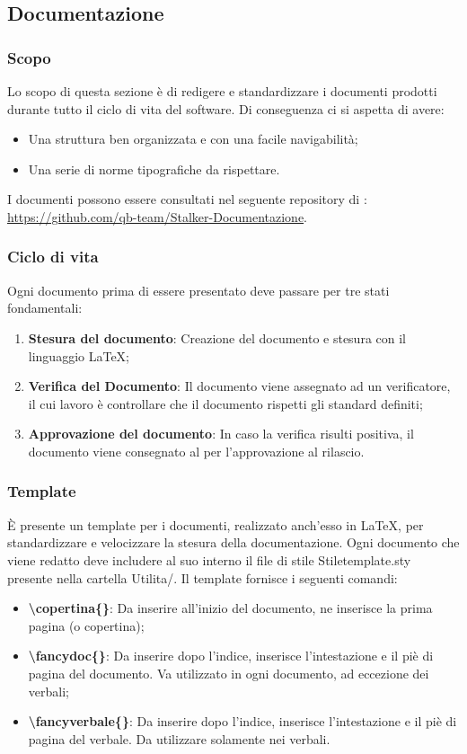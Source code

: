 \subsection{Documentazione}
\subsubsection{Scopo}
Lo scopo di questa sezione è di redigere e standardizzare i documenti prodotti durante tutto il ciclo di vita del software. 
Di conseguenza ci si aspetta di avere:
\begin{itemize}
\item Una struttura ben organizzata e con una facile navigabilità;
\item Una serie di norme tipografiche da rispettare.
\end{itemize}
I documenti possono essere consultati nel seguente repository di : \url{https://github.com/qb-team/Stalker-Documentazione}.

\subsubsection{Ciclo di vita}
Ogni documento prima di essere presentato deve passare per tre stati fondamentali:
\begin{enumerate}
\item \textbf{Stesura del documento}: Creazione del documento e stesura con il linguaggio \LaTeX;
\item \textbf{Verifica del Documento}: Il documento viene assegnato ad un verificatore, il cui lavoro è controllare che il documento rispetti gli standard definiti;
\item \textbf{Approvazione del documento}: In caso la verifica risulti positiva, il documento viene consegnato al \Responsabile{} per l'approvazione al rilascio.
\end{enumerate}

\subsubsection{Template}
È presente un template per i documenti, realizzato anch'esso in \LaTeX{}, per standardizzare e velocizzare la stesura della documentazione.
Ogni documento che viene redatto deve includere al suo interno il file di stile Stiletemplate.sty presente nella cartella Utilita/.
Il template fornisce i seguenti comandi:
\begin{itemize}
\item \textbf{\textbackslash copertina\{\}}: Da inserire all'inizio del documento, ne inserisce la prima pagina (o copertina);
\item \textbf{\textbackslash fancydoc\{\}}: Da inserire dopo l'indice, inserisce l'intestazione e il piè di pagina del documento. Va utilizzato in ogni documento, ad eccezione dei verbali;
\item \textbf{\textbackslash fancyverbale\{\}}: Da inserire dopo l'indice, inserisce l'intestazione e il piè di pagina del verbale. Da utilizzare solamente nei verbali.
\end{itemize}

